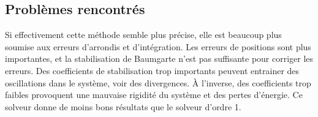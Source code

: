 \subsection{Problèmes rencontrés}\label{subsec:problemes-rencontres-acceleration}
Si effectivement cette méthode semble plus précise, elle est beaucoup plus soumise aux erreurs d'arrondis et d'intégration.
Les erreurs de positions sont plus importantes, et la stabilisation de Baumgarte n'est pas suffisante pour corriger les erreurs.
Des coefficients de stabilisation trop importants peuvent entrainer des oscillations dans le système, voir des divergences.
À l'inverse, des coefficients trop faibles provoquent une mauvaise rigidité du système et des pertes d'énergie.
Ce solveur donne de moins bons résultats que le solveur d'ordre 1.